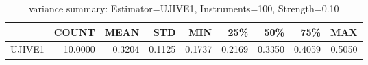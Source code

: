 \begin{table}[ht]
\centering
\caption{variance summary: Estimator=UJIVE1, Instruments=100, Strength=0.10}
\begin{tabular}{lrrrrrrrr}
\toprule
 & COUNT & MEAN & STD & MIN & 25\% & 50\% & 75\% & MAX \\
\midrule
UJIVE1 & 10.0000 & 0.3204 & 0.1125 & 0.1737 & 0.2169 & 0.3350 & 0.4059 & 0.5050 \\
\bottomrule
\end{tabular}
\end{table}
